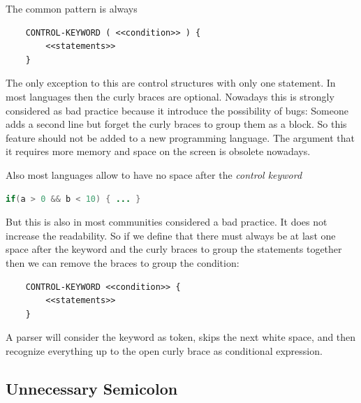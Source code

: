\documentclass[11pt, a4paper]{report}
\begin{document}
The common pattern is always

\begin{lstlisting}
    CONTROL-KEYWORD ( <<condition>> ) { 
        <<statements>> 
    }
\end{lstlisting}

The only exception to this are control structures with only one statement. In most languages then the curly braces are optional. Nowadays this is strongly considered as bad practice because it introduce the possibility of bugs: Someone adds a second line but forget the curly braces to group them as a block. So this feature should not be added to a new programming language. The argument that it requires more memory and space on the screen is obsolete nowadays.

Also most languages allow to have no space after the \textit{control keyword}

\begin{lstlisting}[language=Java]
    if(a > 0 && b < 10) { ... }
\end{lstlisting}

But this is also in most communities considered a bad practice. It does not increase the readability. So if we define that there must always be at last one  space after the keyword and the curly braces to group the statements together  then we can remove the braces to group the condition:

\begin{lstlisting}
    CONTROL-KEYWORD <<condition>> { 
        <<statements>> 
    }
\end{lstlisting}

A parser will consider the keyword as token, skips the next white space, and then recognize everything up to the open curly brace as conditional expression.

\subsection{Unnecessary Semicolon}

\end{document}
